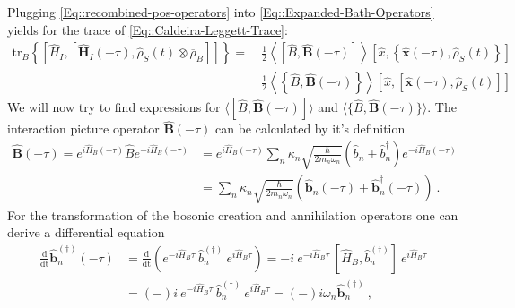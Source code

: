 	Plugging \autoref{Eq::recombined-pos-operators} into \autoref{Eq::Expanded-Bath-Operators} yields for the trace of \autoref{Eq::Caldeira-Leggett-Trace}:
	\begin{equation}
		\begin{split}
			\text{tr}_B \left\{  \left[{\hat{H}}_I, \left[{\boldsymbol{\hat{H}}}_I(- \tau), {\hat{\rho}}_S(t) \otimes \overline{\rho}_B \right]\right]  \right\} =	~&\frac{1}{2} \left\langle \left[\hat{B}, \boldsymbol{\hat{B}}(-\tau) \right]  \right \rangle \left[\hat{x}, \left\{\boldsymbol{\hat{x}}(-\tau),  \hat{\rho}_S(t)\right\}\right] \\
			& \frac{1}{2} \left\langle \left \{\hat{B}, \boldsymbol{\hat{B}}(-\tau)\right \}  \right \rangle \left[\hat{x}, \left[\boldsymbol{\hat{x}}(-\tau),  \hat{\rho}_S(t)\right] \right]
		\end{split}
	\end{equation}
	We will now try to find expressions for $\langle [\hat{B}, \boldsymbol{\hat{B}}(-\tau) ]  \rangle$ and $\langle  \{\hat{B}, \boldsymbol{\hat{B}}(-\tau) \}  \rangle$. The interaction picture operator $\boldsymbol{\hat{B}}(-\tau)$ can be calculated by it's definition
	\begin{equation}
		\begin{split}
			\boldsymbol{\hat{B}}(-\tau) =	e^{i \hat{H}_B (-\tau)} \hat{B} e^{- i \hat{H}_B (-\tau)} &=	 e^{i \hat{H}_B (-\tau)} \sum_n \kappa_n \sqrt{\frac{\hbar}{2 m_n \omega_n}} \left(\hat{b}_n + \hat{b}_n^\dagger\right) e^{- i \hat{H}_B (-\tau)} \\
			&=	\sum_n \kappa_n \sqrt{\frac{\hbar}{2 m_n \omega_n}} \left(\boldsymbol{\hat{b}}_n(-\tau) + \boldsymbol{\hat{b}}_n^\dagger(-\tau) \right)~.
		\end{split}
	\end{equation}
	For the transformation of the bosonic creation and annihilation operators one can derive a differential equation
	\begin{equation} \label{Eq::creation-annihilation-ode}
		\begin{split}
			\frac{\text{d}}{\text{dt}} \boldsymbol{\hat{b}}^{(\dagger)}_n(-\tau) &=	\frac{\text{d}}{\text{dt}} \left(e^{- i \hat{H}_B \tau}~ \hat{b}_n^{(\dagger)}~e^{ i \hat{H}_B \tau}\right) = -i~e^{- i \hat{H}_B \tau}~ \left[\hat{H}_B, \hat{b}_n^{(\dagger)}\right]~e^{i \hat{H}_B \tau} \\
			&=	(-)i~e^{- i \hat{H}_B \tau}~ \hat{b}_n^{(\dagger)}~e^{i \hat{H}_B \tau}  =	(-)i\omega_n \boldsymbol{\hat{b}}_n^{(\dagger)}~,
		\end{split}
	\end{equation}
